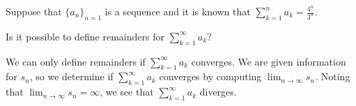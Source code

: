 \documentclass{ximera}
\author{Jim Talamo}
\begin{document}
\begin{exercise}

Suppose that $\{a_n\}_{n=1}$ is a sequence and it is known that $\sum_{k=1}^n a_k = \frac{4^n}{3^n}$.

Is it possible to define remainders for $\sum_{k=1}^{\infty} a_k$?

\begin{multipleChoice}
\end{multipleChoice}

\begin{feedback}
We can only define remainders if $\sum_{k=1}^{\infty} a_k$ converges.  We are given information for $s_n$, so we determine  if $\sum_{k=1}^{\infty} a_k$ converges by computing $\lim_{n \to \infty} s_n$.  Noting that $\lim_{n \to \infty} s_n = \infty$, we see that  $\sum_{k=1}^{\infty} a_k$ diverges.
\end{feedback}

\end{exercise}
\end{document}
